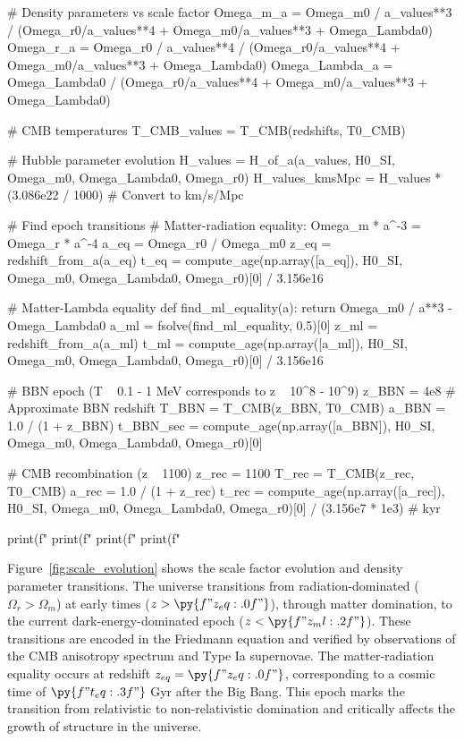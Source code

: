 \documentclass[a4paper, 11pt]{article}
\begin{document}
\begin{pycode}
# Density parameters vs scale factor
Omega_m_a = Omega_m0 / a_values**3 / (Omega_r0/a_values**4 + Omega_m0/a_values**3 + Omega_Lambda0)
Omega_r_a = Omega_r0 / a_values**4 / (Omega_r0/a_values**4 + Omega_m0/a_values**3 + Omega_Lambda0)
Omega_Lambda_a = Omega_Lambda0 / (Omega_r0/a_values**4 + Omega_m0/a_values**3 + Omega_Lambda0)

# CMB temperatures
T_CMB_values = T_CMB(redshifts, T0_CMB)

# Hubble parameter evolution
H_values = H_of_a(a_values, H0_SI, Omega_m0, Omega_Lambda0, Omega_r0)
H_values_kmsMpc = H_values * (3.086e22 / 1000)  # Convert to km/s/Mpc

# Find epoch transitions
# Matter-radiation equality: Omega_m * a^{-3} = Omega_r * a^{-4}
a_eq = Omega_r0 / Omega_m0
z_eq = redshift_from_a(a_eq)
t_eq = compute_age(np.array([a_eq]), H0_SI, Omega_m0, Omega_Lambda0, Omega_r0)[0] / 3.156e16

# Matter-Lambda equality
def find_ml_equality(a):
    return Omega_m0 / a**3 - Omega_Lambda0
a_ml = fsolve(find_ml_equality, 0.5)[0]
z_ml = redshift_from_a(a_ml)
t_ml = compute_age(np.array([a_ml]), H0_SI, Omega_m0, Omega_Lambda0, Omega_r0)[0] / 3.156e16

# BBN epoch (T ~ 0.1 - 1 MeV corresponds to z ~ 10^8 - 10^9)
z_BBN = 4e8  # Approximate BBN redshift
T_BBN = T_CMB(z_BBN, T0_CMB)
a_BBN = 1.0 / (1 + z_BBN)
t_BBN_sec = compute_age(np.array([a_BBN]), H0_SI, Omega_m0, Omega_Lambda0, Omega_r0)[0]

# CMB recombination (z ~ 1100)
z_rec = 1100
T_rec = T_CMB(z_rec, T0_CMB)
a_rec = 1.0 / (1 + z_rec)
t_rec = compute_age(np.array([a_rec]), H0_SI, Omega_m0, Omega_Lambda0, Omega_r0)[0] / (3.156e7 * 1e3)  # kyr

print(f"%
print(f"%
print(f"%
print(f"%

\end{pycode}

Figure~\ref{fig:scale_evolution} shows the scale factor evolution and density parameter transitions.
The universe transitions from radiation-dominated ($\Omega_r > \Omega_m$) at early times ($z > \py{f"{z_eq:.0f}"}$),
through matter domination, to the current dark-energy-dominated epoch ($z < \py{f"{z_ml:.2f}"}$).
These transitions are encoded in the Friedmann equation and verified by observations of the CMB
anisotropy spectrum and Type Ia supernovae. The matter-radiation equality occurs at redshift
$z_{eq} = \py{f"{z_eq:.0f}"}$, corresponding to a cosmic time of $\py{f"{t_eq:.3f}"}$ Gyr after
the Big Bang. This epoch marks the transition from relativistic to non-relativistic domination
and critically affects the growth of structure in the universe.
\end{document}
